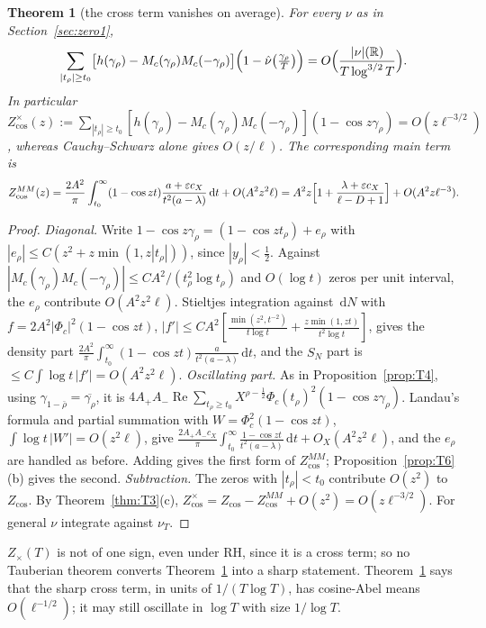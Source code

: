 \documentclass[11pt]{amsart}
\newcommand{\R}{\mathbb{R}}
\newcommand{\dd}{\,\mathrm{d}}
\newcommand{\eps}{\varepsilon}
\DeclareMathOperator{\re}{Re}
\newtheorem{theorem}{Theorem}[section]
\theoremstyle{definition}
\theoremstyle{remark}
\numberwithin{equation}{section}
\begin{document}
\begin{theorem}[the cross term vanishes on average]\label{thm:T5}
For every $\nu$ as in Section~\ref{sec:zero1},
\[
\sum_{|t_\rho|\ge t_0}\bigl[h(\gamma_\rho)-M_c(\gamma_\rho)M_c(-\gamma_\rho)\bigr]\Bigl(1-\hat\nu\bigl(\tfrac{\gamma_\rho}T\bigr)\Bigr)=O\Bigl(\frac{|\nu|(\R)}{T\log^{3/2}T}\Bigr).
\]
In particular $Z^\times_{\cos}(z):=\sum_{|t_\rho|\ge t_0}[h(\gamma_\rho)-M_c(\gamma_\rho)M_c(-\gamma_\rho)](1-\cos z\gamma_\rho)=O(z\ell^{-3/2})$, whereas Cauchy--Schwarz alone gives $O(z/\ell)$. The corresponding main term is
\[
Z^{MM}_{\cos}(z)=\frac{2A^2}\pi\int_{t_0}^\infty(1-\cos zt)\frac{a+\eps c_X}{t^2(a-\lambda)}\dd t+O(A^2z^2\ell)=A^2z\Bigl[1+\frac{\lambda+\eps c_X}{\ell-D+1}\Bigr]+O(A^2z\ell^{-3}).
\]
\end{theorem}

\begin{proof}
\emph{Diagonal.} Write $1-\cos z\gamma_\rho=(1-\cos zt_\rho)+e_\rho$ with $|e_\rho|\le C(z^2+z\min(1,z|t_\rho|))$, since $|y_\rho|<\frac12$. Against $|M_c(\gamma_\rho)M_c(-\gamma_\rho)|\le CA^2/(t_\rho^2\log t_\rho)$ and $O(\log t)$ zeros per unit interval, the $e_\rho$ contribute $O(A^2z^2\ell)$. Stieltjes integration against $\dd N$ with $f=2A^2|\Phi_c|^2(1-\cos zt)$, $|f'|\le CA^2[\frac{\min(z^2,t^{-2})}{t\log t}+\frac{z\min(1,zt)}{t^2\log t}]$, gives the density part $\frac{2A^2}\pi\int_{t_0}^\infty(1-\cos zt)\frac a{t^2(a-\lambda)}\dd t$, and the $S_N$ part is $\le C\int\log t\,|f'|=O(A^2z^2\ell)$.
\emph{Oscillating part.} As in Proposition~\ref{prop:T4}, using $\gamma_{1-\bar\rho}=\overline{\gamma_\rho}$, it is $4A_+A_-\re\sum_{t_\rho\ge t_0}X^{\rho-\frac12}\Phi_c(t_\rho)^2(1-\cos z\gamma_\rho)$. Landau's formula and partial summation with $W=\Phi_c^2(1-\cos zt)$, $\int\log t\,|W'|=O(z^2\ell)$, give $\frac{2A_+A_-c_X}\pi\int_{t_0}^\infty\frac{1-\cos zt}{t^2(a-\lambda)}\dd t+O_X(A^2z^2\ell)$, and the $e_\rho$ are handled as before. Adding gives the first form of $Z^{MM}_{\cos}$; Proposition~\ref{prop:T6}(b) gives the second.
\emph{Subtraction.} The zeros with $|t_\rho|<t_0$ contribute $O(z^2)$ to $Z_{\cos}$. By Theorem~\ref{thm:T3}(c), $Z^\times_{\cos}=Z_{\cos}-Z^{MM}_{\cos}+O(z^2)=O(z\ell^{-3/2})$. For general $\nu$ integrate against $\nu_T$.
\end{proof}

$Z_\times(T)$ is not of one sign, even under RH, since it is a cross term; so no Tauberian theorem converts Theorem~\ref{thm:T5} into a sharp statement. Theorem~\ref{thm:T5} says that the sharp cross term, in units of $1/(T\log T)$, has cosine-Abel means $O(\ell^{-1/2})$; it may still oscillate in $\log T$ with size $1/\log T$.
\end{document}
